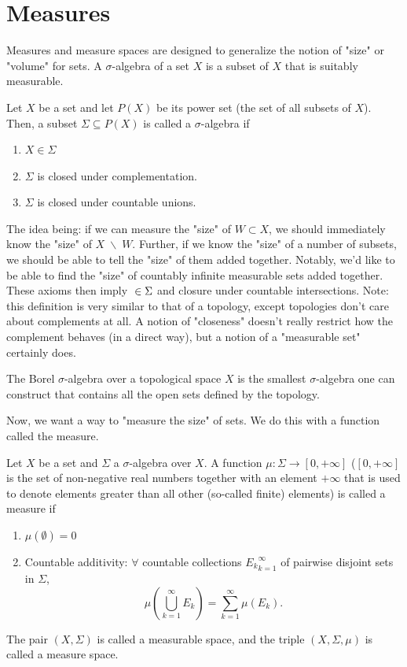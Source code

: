\chapter{Measures}
Measures and measure spaces are designed to generalize the notion of "size" or "volume" for sets. A $\sigma$-algebra of a set $X$ is a subset of $X$ that is suitably measurable. 
\begin{definition}
	Let $X$ be a set and let $P(X)$ be its power set (the set of all subsets of $X$). Then, a subset $\Sigma \subseteq P(X)$ is called a $\sigma$-algebra if
	\begin{enumerate}
		\item $X\in \Sigma$
		\item $\Sigma$ is closed under complementation.
		\item $\Sigma$ is closed under countable unions.
	\end{enumerate}
\end{definition}
The idea being: if we can measure the "size" of $W\subset X$, we should immediately know the "size" of $X\;\backslash \;W$. Further, if we know the "size" of a number of subsets, we should be able to tell the "size" of them added together. Notably, we'd like to be able to find the "size" of countably infinite measurable sets added together. These axioms then imply $\null\in \Sigma$ and closure under countable intersections. Note: this definition is very similar to that of a topology, except topologies don't care about complements at all. A notion of "closeness" doesn't really restrict how the complement behaves (in a direct way), but a notion of a "measurable set" certainly does. 
\begin{definition}
	The Borel $\sigma$-algebra over a topological space $X$ is the smallest $\sigma$-algebra one can construct that contains all the open sets defined by the topology.
\end{definition}
Now, we want a way to "measure the size" of sets. We do this with a function called the measure.
\begin{definition}[Measure]
	Let $X$ be a set and $\Sigma$ a $\sigma$-algebra over $X$. A function $\mu: \Sigma \rightarrow [0, +\infty]$ ($[0, +\infty]$ is the set of non-negative real numbers together with an element $+\infty$ that is used to denote elements greater than all other (so-called finite) elements) is called a measure if
	\begin{enumerate}
		\item $\mu(\emptyset) = 0$
		\item Countable additivity: $\forall$ countable collections ${E_k}_{k=1}^\infty$ of pairwise disjoint sets in $\Sigma$,
		$$
			\mu\left( \bigcup_{k=1}^\infty E_k\right) = \sum_{k=1}^\infty \mu(E_k).
		$$
	\end{enumerate}
\end{definition}
The pair $(X, \Sigma)$ is called a measurable space, and the triple $(X, \Sigma, \mu)$ is called a measure space. 
